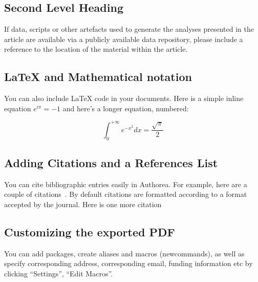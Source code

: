 \documentclass[alpha-refs]{wiley-article}
\begin{document}
\par\null

\subsection{Second Level Heading}\label{second-level-heading}

If data, scripts or other artefacts used to generate the analyses
presented in the article are available via a publicly available data
repository, please include a reference to the location of the material
within the article.

\par\null

\subsection{LaTeX and Mathematical notation}
\label{sec:latex}
You can also include LaTeX code in your documents. Here is a simple inline equation $e^{i\pi}=-1$ and here's a longer equation, numbered:

\begin{equation}
\label{eqn:some}
\int_0^{+\infty}e^{-x^2}dx=\frac{\sqrt{\pi}}{2}
\end{equation}

\par\null

\subsection{Adding Citations and a References
List}

You can cite bibliographic entries easily in Authorea. For example, here
are a couple of citations~\cite{Cavalleri_2016,Gregory_2015}. By default citations are
formatted according to a format accepted by the journal. Here is one
more citation~\cite{Meskine_2019}

\par\null

\subsection{Customizing the exported
PDF}

{\label{730632}}

You can add packages, create aliases and macros (newcommands), as well
as specify corresponding address, corresponding email, funding
information etc by clicking ``Settings'', ``Edit Macros''.
\end{document}
